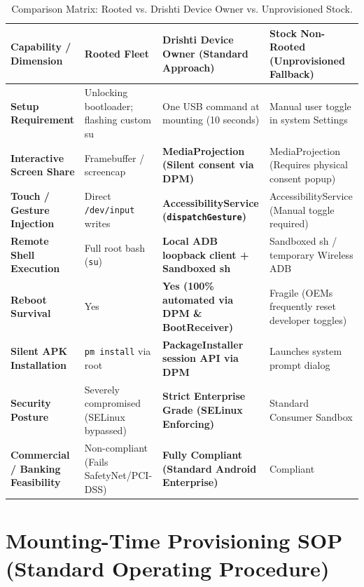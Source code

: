 \documentclass[11pt,a4paper]{article}
\begin{document}
\begin{table}[htbp]
\centering
\small
\begin{tabularx}{\textwidth}{p{3.8cm} p{3.4cm} X X}
\toprule
\textbf{Capability / Dimension} & \textbf{Rooted Fleet} & \textbf{Drishti Device Owner (Standard Approach)} & \textbf{Stock Non-Rooted (Unprovisioned Fallback)} \\
\midrule
\textbf{Setup Requirement} & Unlocking bootloader; flashing custom su & One USB command at mounting (10 seconds) & Manual user toggle in system Settings \\
\addlinespace
\textbf{Interactive Screen Share} & Framebuffer / screencap & \textbf{MediaProjection (Silent consent via DPM)} & MediaProjection (Requires physical consent popup) \\
\addlinespace
\textbf{Touch / Gesture Injection} & Direct \texttt{/dev/input} writes & \textbf{AccessibilityService (\texttt{dispatchGesture})} & AccessibilityService (Manual toggle required) \\
\addlinespace
\textbf{Remote Shell Execution} & Full root bash (\texttt{su}) & \textbf{Local ADB loopback client + Sandboxed sh} & Sandboxed sh / temporary Wireless ADB \\
\addlinespace
\textbf{Reboot Survival} & Yes & \textbf{Yes (100\% automated via DPM \& BootReceiver)} & Fragile (OEMs frequently reset developer toggles) \\
\addlinespace
\textbf{Silent APK Installation} & \texttt{pm install} via root & \textbf{PackageInstaller session API via DPM} & Launches system prompt dialog \\
\addlinespace
\textbf{Security Posture} & Severely compromised (SELinux bypassed) & \textbf{Strict Enterprise Grade (SELinux Enforcing)} & Standard Consumer Sandbox \\
\addlinespace
\textbf{Commercial / Banking Feasibility} & Non-compliant (Fails SafetyNet/PCI-DSS) & \textbf{Fully Compliant (Standard Android Enterprise)} & Compliant \\
\bottomrule
\end{tabularx}
\caption{Comparison Matrix: Rooted vs. Drishti Device Owner vs. Unprovisioned Stock.}
\label{tab:comparison}
\end{table}

\section{Mounting-Time Provisioning SOP (Standard Operating Procedure)}
\end{document}
